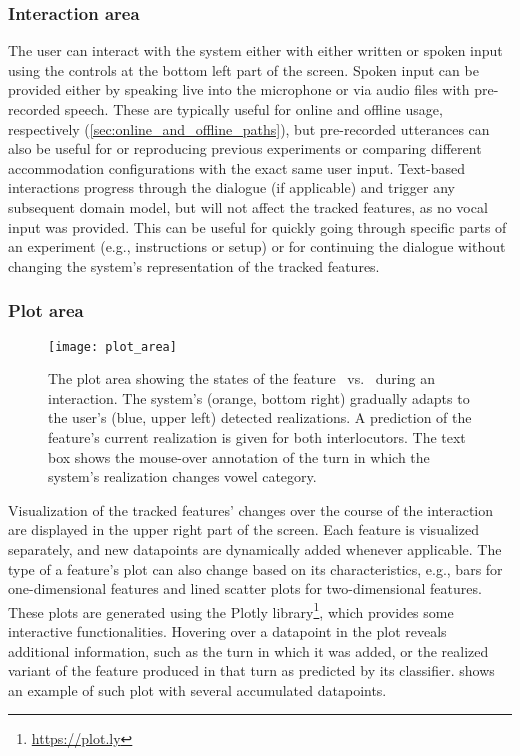 \subsubsection{Interaction area}
\label{subsubsec:interaction_area}

The user can interact with the system either with either written or spoken input using the controls at the bottom left part of the screen.
Spoken input can be provided either by speaking live into the microphone or via audio files with pre-recorded speech.
These are typically useful for online and offline usage, respectively (\cref{sec:online_and_offline_paths}), but pre-recorded utterances can also be useful for or reproducing previous experiments or comparing different accommodation configurations with the exact same user input.
Text-based interactions progress through the dialogue (if applicable) and trigger any subsequent domain model, but will not affect the tracked features, as no vocal input was provided.
This can be useful for quickly going through specific parts of an experiment (e.g., instructions or setup) or for continuing the dialogue without changing the system's representation of the tracked features.

\subsubsection{Plot area}
\label{subsubsec:plot_area}

\begin{figure}[t]
	\centering
	\texttt{[image: plot\_area]}
	\caption[Real-time dynamic visualization of phonetic changes]
		{The plot area showing the states of the feature \textipa{[E:]}~vs.~\textipa{[e:]} during an interaction.
		The system's (orange, bottom right) gradually adapts to the user's (blue, upper left) detected realizations.
		A prediction of the feature's current realization is given for both interlocutors.
		The text box shows the mouse-over annotation of the turn in which the system's realization changes vowel category.}
	\label{fig:plot}
\end{figure}

Visualization of the tracked features' changes over the course of the interaction are displayed in the upper right part of the screen.
Each feature is visualized separately, and new datapoints are dynamically added whenever applicable.
The type of a feature's plot can also change based on its characteristics, e.g., bars for one-dimensional features and lined scatter plots for two-dimensional features.
These plots are generated using the Plotly library\footnote{\url{https://plot.ly}}, which provides some interactive functionalities.
Hovering over a datapoint in the plot reveals additional information, such as the turn in which it was added, or the realized variant of the feature produced in that turn as predicted by its classifier.
 shows an example of such plot with several accumulated datapoints.

